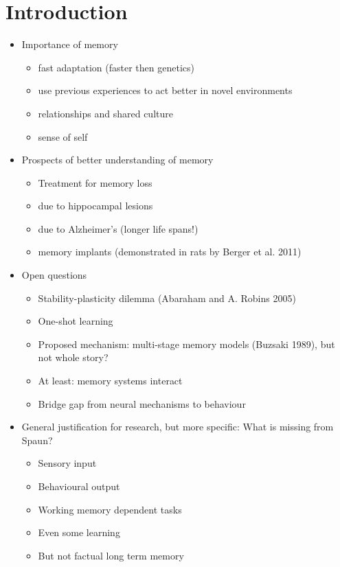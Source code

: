 \chapter{Introduction}

\begin{itemize}
    \item Importance of memory
        \begin{itemize}
            \item fast adaptation (faster then genetics)
            \item use previous experiences to act better in novel environments
            \item relationships and shared culture
            \item sense of self
        \end{itemize}
    \item Prospects of better understanding of memory
        \begin{itemize}
            \item Treatment for memory loss
            \item due to hippocampal lesions
            \item due to Alzheimer's (longer life spans!)
            \item memory implants (demonstrated in rats by Berger et al. 2011)
        \end{itemize}
    \item Open questions
        \begin{itemize}
            \item Stability-plasticity dilemma (Abaraham and A. Robins 2005)
            \item One-shot learning
            \item Proposed mechanism: multi-stage memory models (Buzsaki 1989), but not whole story?
            \item At least: memory systems interact
            \item Bridge gap from neural mechanisms to behaviour
        \end{itemize}
    \item General justification for research, but more specific: What is missing from Spaun?
        \begin{itemize}
            \item Sensory input
            \item Behavioural output
            \item Working memory dependent tasks
            \item Even some learning
            \item But not factual long term memory
        \end{itemize}
\end{itemize}

